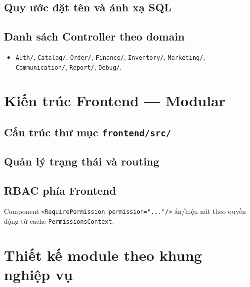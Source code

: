 \subsection{Quy ước đặt tên và ánh xạ SQL}

\subsection{Danh sách Controller theo domain}
\begin{itemize}
  \item \texttt{Auth/}, \texttt{Catalog/}, \texttt{Order/}, \texttt{Finance/}, \texttt{Inventory/}, \texttt{Marketing/}, \texttt{Communication/}, \texttt{Report/}, \texttt{Debug/}.
\end{itemize}

\section{Kiến trúc Frontend --- Modular}
\label{sec:frontend_arch}

\subsection{Cấu trúc thư mục \texttt{frontend/src/}}

\subsection{Quản lý trạng thái và routing}

\subsection{RBAC phía Frontend}
Component \texttt{<RequirePermission permission="..."/>} ẩn/hiện nút theo quyền động từ cache \texttt{PermissionsContext}.

\section{Thiết kế module theo khung nghiệp vụ}
\label{sec:modules}

